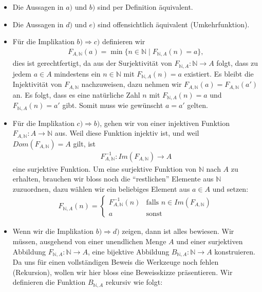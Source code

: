  \begin{itemize}
        \item Die Aussagen in $a)$ und $b)$ sind per Definition äquivalent.
        \item Die Aussagen in $d)$ und $e)$ sind offensichtlich äquivalent (Umkehrfunktion).
        \item Für die Implikation $b)\Rightarrow c)$ definieren wir
        \begin{align*}
            F_{A,\mathbb{N}}(a)=\min\{n\in\mathbb{N} \mid F_{\mathbb{N},A}(n)=a\},
        \end{align*}
        dies ist gerechtfertigt, da aus der Surjektivität von $F_{\mathbb{N},A}:\mathbb{N}\to A$ folgt, dass zu jedem $a\in A$ mindestens ein $n\in\mathbb{N}$ mit $F_{\mathbb{N},A}(n)=a$ existiert. Es bleibt die Injektivität von $F_{A,\mathbb{N}}$ nachzuweisen, dazu nehmen wir $F_{A,\mathbb{N}}(a)=F_{A,\mathbb{N}}(a')$ an. Es folgt, dass es eine natürliche Zahl $n$ mit $F_{\mathbb{N},A}(n)=a$ und $F_{\mathbb{N},A}(n)=a'$ gibt. Somit muss wie gewünscht $a=a'$ gelten.
        \item Für die Implikation $c)\Rightarrow b)$, gehen wir von einer injektiven Funktion $F_{A,\mathbb{N}}:A\to\mathbb{N}$ aus.
        Weil diese Funktion injektiv ist, und weil $Dom(F_{A,\mathbb{N}})=A$ gilt, ist
        \begin{align*}
            F_{A,\mathbb{N}}^{-1}:Im(F_{A,\mathbb{N}}) \to A
        \end{align*}
        eine surjektive Funktion. Um eine surjektive Funktion von $\mathbb{N}$ nach $A$ zu erhalten, brauchen wir bloss noch die ``restlichen'' Elemente aus $\mathbb{N}$ zuzuordnen, dazu wählen wir ein beliebiges Element aus $a\in A$ und setzen:
        \begin{align*}
            F_{\mathbb{N},A}(n)=
                \begin{cases}
		F_{A,\mathbb{N}}^{-1}(n)&\text{falls }n\in Im(F_{A,\mathbb{N}})\\
                a&\text{sonst}
                \end{cases}
        \end{align*}
        \item Wenn wir die Implikation $b)\Rightarrow d)$ zeigen, dann ist alles bewiesen. Wir müssen, ausgehend von einer unendlichen Menge $A$ und einer surjektiven Abbildung $F_{\mathbb{N},A}: \mathbb{N}\to A$, eine bijektive Abbildung $B_{\mathbb{N},A}: \mathbb{N}\to A$ konstruieren. Da uns für einen vollständigen Beweis die Werkzeuge noch fehlen (Rekursion), wollen wir hier bloss eine Beweisskizze präsentieren. Wir definieren die Funktion $B_{\mathbb{N},A}$ rekursiv wie folgt:

\end{itemize}
